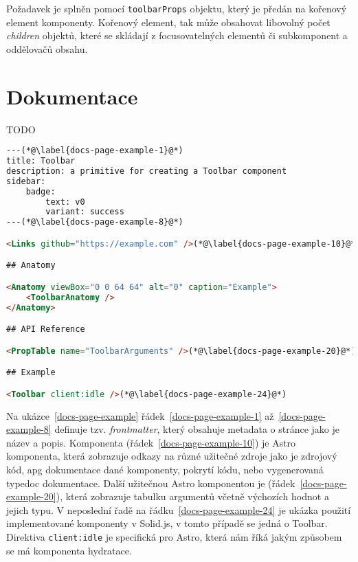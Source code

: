 Požadavek \hyperref[tfr11]{} je splněn pomocí \texttt{toolbarProps} objektu, který je předán na kořenový element komponenty.
Kořenový element, tak může obsahovat libovolný počet \textit{children} objektů, které se skládají z focusovatelných elementů či subkomponent a oddělovačů obsahu.

\clearpage

\section{Dokumentace}

TODO

\begin{lstlisting}[caption={Ukázka stránky dokumentace psané v MDX}, label={docs-page-example}, language=html]
---(*@\label{docs-page-example-1}@*)
title: Toolbar
description: a primitive for creating a Toolbar component
sidebar:
    badge:
        text: v0
        variant: success
---(*@\label{docs-page-example-8}@*)

<Links github="https://example.com" />(*@\label{docs-page-example-10}@*)

## Anatomy

<Anatomy viewBox="0 0 64 64" alt="0" caption="Example">
    <ToolbarAnatomy />
</Anatomy>

## API Reference

<PropTable name="ToolbarArguments" />(*@\label{docs-page-example-20}@*)

## Example

<Toolbar client:idle />(*@\label{docs-page-example-24}@*)
\end{lstlisting}

Na ukázce~\ref{docs-page-example} řádek~\ref{docs-page-example-1} až~\ref{docs-page-example-8} definuje tzv. \textit{frontmatter}, který obsahuje metadata o stránce jako je název a popis.
Komponenta  (řádek~\ref{docs-page-example-10}) je Astro komponenta, která zobrazuje odkazy na různé užitečné zdroje jako je zdrojový kód, \gls{apg} dokumentace dané komponenty, pokrytí kódu, nebo vygenerovaná typedoc dokumentace.
Další užitečnou Astro komponentou je  (řádek~\ref{docs-page-example-20}), která zobrazuje tabulku argumentů včetně výchozích hodnot a jejich typu.
V neposlední řadě na řádku~\ref{docs-page-example-24} je ukázka použití implementované komponenty v Solid.js, v tomto případě se jedná o Toolbar.
Direktiva \texttt{client:idle} je specifická pro Astro, která nám říká jakým způsobem se má komponenta \gls{hydratace}.

